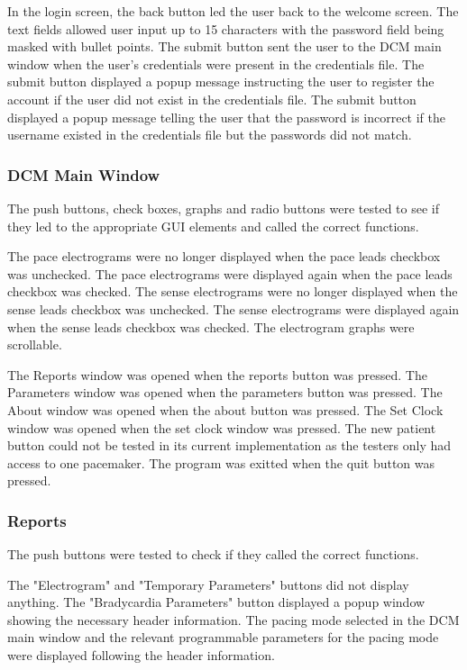 \documentclass[12pt]{article}
\begin{document}
In the login screen, the back button led the user back to the welcome screen. The text fields allowed user input up to 15 characters with the password field being masked with bullet points. The submit button sent the user to the DCM main window when the user's credentials were present in the credentials file. The submit button displayed a popup message instructing the user to register the account if the user did not exist in the credentials file. The submit button displayed a popup message telling the user that the password is incorrect if the username existed in the credentials file but the passwords did not match.

\subsubsection{DCM Main Window}\label{Testing:DCMMainWindow}
The push buttons, check boxes, graphs and radio buttons were tested to see if they led to the appropriate GUI elements and called the correct functions.

The pace electrograms were no longer displayed when the pace leads checkbox was unchecked. The pace electrograms were displayed again when the pace leads checkbox was checked. The sense electrograms were no longer displayed when the sense leads checkbox was unchecked. The sense electrograms were displayed again when the sense leads checkbox was checked. The electrogram graphs were scrollable.

The Reports window was opened when the reports button was pressed. The Parameters window was opened when the parameters button was pressed. The About window was opened when the about button was pressed. The Set Clock window was opened when the set clock window was pressed. The new patient button could not be tested in its current implementation as the testers only had access to one pacemaker. The program was exitted when the quit button was pressed.

\subsubsection{Reports}\label{Testing:Reports}
The push buttons were tested to check if they called the correct functions.

The "Electrogram" and "Temporary Parameters" buttons did not display anything. The "Bradycardia Parameters" button displayed a popup window showing the necessary header information. The pacing mode selected in the DCM main window and the relevant programmable parameters for the pacing mode were displayed following the header information.
\end{document}
